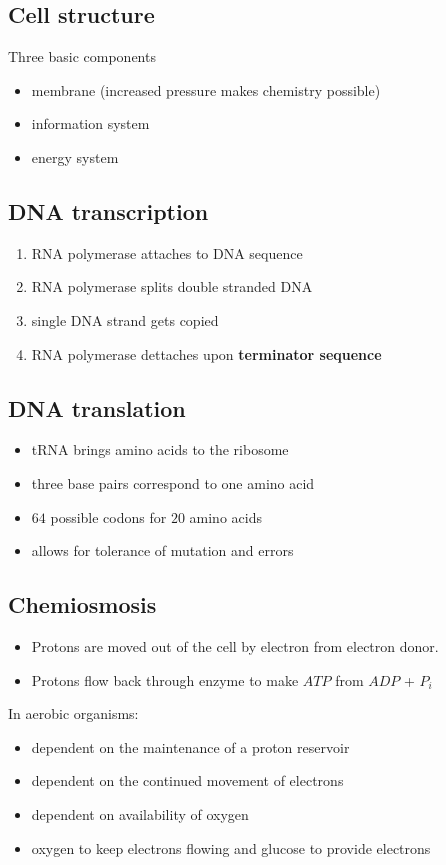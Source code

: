 \documentclass{article}
\theoremstyle{sltheorem}
\begin{document}
\subsection{Cell structure}
Three basic components
\begin{itemize}
    \item membrane (increased pressure makes chemistry possible)
    \item information system
    \item energy system
\end{itemize}
\subsection{DNA transcription}
\begin{enumerate}
    \item RNA polymerase attaches to DNA sequence
    \item RNA polymerase splits double stranded DNA
    \item single DNA strand gets copied
    \item RNA polymerase dettaches upon \textbf{terminator sequence}
\end{enumerate}
\subsection{DNA translation}
\begin{itemize}
    \item tRNA brings amino acids to the ribosome
    \item three base pairs correspond to one amino acid
    \item $64$ possible codons for $20$ amino acids
    \item allows for tolerance of mutation and errors
\end{itemize}
\subsection{Chemiosmosis}
\begin{itemize}
    \item Protons are moved out of the cell by electron from electron donor.
    \item Protons flow back through enzyme to make $ATP$ from $ADP$ + $P_i$
\end{itemize}
In aerobic organisms:
\begin{itemize}
    \item dependent on the maintenance of a proton reservoir
    \item dependent on the continued movement of electrons
    \item dependent on availability of oxygen
    \item oxygen to keep electrons flowing and glucose to provide electrons
\end{itemize}
\end{document}

